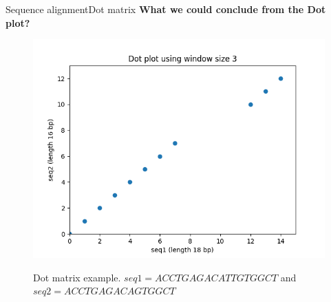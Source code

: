 \documentclass[10pt]{beamer}
\begin{document}
{%
\begin{frame}{Sequence alignment}{Dot matrix}
	\centering
	\textbf{What we could conclude from the Dot plot?}	 
	\begin{figure}[]		
		\includegraphics[width=\textwidth,height=0.5\textheight,keepaspectratio]{img/alignment/dot_plot2.png}
		\label{img:uniprot}
		\caption{Dot matrix example. $seq1 = ACCTGAGACATTGTGGCT$ and $seq2 = ACCTGAGACAGTGGCT$}
	\end{figure}
\end{frame}

}
\end{document}
